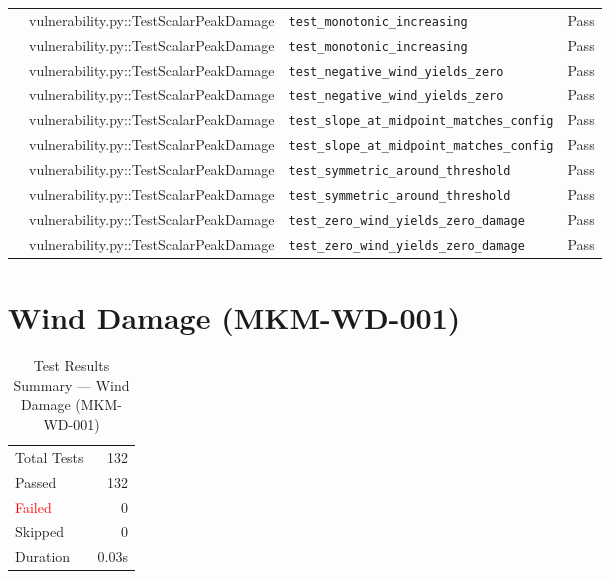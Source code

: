 \documentclass[11pt,a4paper]{article}
\begin{document}
\begin{center}
\begin{longtable}{p{2.2cm} p{4.5cm} p{6.5cm} p{1.4cm}}
     & vulnerability.py::TestScalarPeakDamage & \texttt{test\_monotonic\_increasing} & \textcolor{green!60!black}{Pass} \\
     & vulnerability.py::TestScalarPeakDamage & \texttt{test\_monotonic\_increasing} & \textcolor{green!60!black}{Pass} \\
     & vulnerability.py::TestScalarPeakDamage & \texttt{test\_negative\_wind\_yields\_zero} & \textcolor{green!60!black}{Pass} \\
     & vulnerability.py::TestScalarPeakDamage & \texttt{test\_negative\_wind\_yields\_zero} & \textcolor{green!60!black}{Pass} \\
     & vulnerability.py::TestScalarPeakDamage & \texttt{test\_slope\_at\_midpoint\_matches\_config} & \textcolor{green!60!black}{Pass} \\
     & vulnerability.py::TestScalarPeakDamage & \texttt{test\_slope\_at\_midpoint\_matches\_config} & \textcolor{green!60!black}{Pass} \\
     & vulnerability.py::TestScalarPeakDamage & \texttt{test\_symmetric\_around\_threshold} & \textcolor{green!60!black}{Pass} \\
     & vulnerability.py::TestScalarPeakDamage & \texttt{test\_symmetric\_around\_threshold} & \textcolor{green!60!black}{Pass} \\
     & vulnerability.py::TestScalarPeakDamage & \texttt{test\_zero\_wind\_yields\_zero\_damage} & \textcolor{green!60!black}{Pass} \\
     & vulnerability.py::TestScalarPeakDamage & \texttt{test\_zero\_wind\_yields\_zero\_damage} & \textcolor{green!60!black}{Pass} \\
    \midrule
\end{longtable}
\end{center}
\clearpage

\section{Wind Damage (MKM-WD-001)}

\begin{table}[H]
    \centering
    \caption{Test Results Summary --- Wind Damage (MKM-WD-001)}
    \label{tab:test_summary_mkm_wd_001}
    \begin{tabular}{lr}
        \toprule
        Total Tests & 132 \\
        \textcolor{green!60!black}{Passed} & 132 \\
        \textcolor{red}{Failed} & 0 \\
        Skipped & 0 \\
        Duration & 0.03s \\
        \bottomrule
    \end{tabular}
\end{table}
\end{document}
